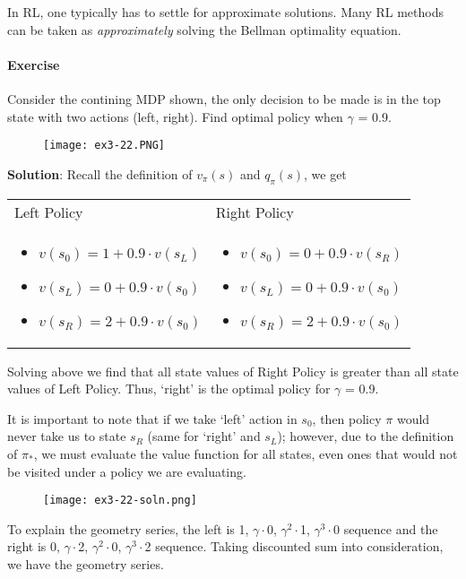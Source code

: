 \documentclass[sutton_barto_notes.tex]{subfiles}
\begin{document}
In RL, one typically has to settle for approximate solutions. Many RL methods can be taken as \textit{approximately} solving the Bellman optimality equation.

\paragraph{Exercise} Consider the contining MDP shown, the only decision to be made is in the top state with two actions (left, right).
Find optimal policy when $\gamma$ = 0.9.

\begin{figure}[!h]
  \centering
  \texttt{[image: ex3-22.PNG]}
  \label{fig:ex3-22}
\end{figure}

\textbf{Solution}: Recall the definition of $v_\pi(s)$ and $q_\pi(s)$, we get

\begin{table}[h!]
\begin{tabular}{p{}p{}}
Left Policy & Right Policy \\
\begin{itemize}
\item $ v(s_0) = 1 + 0.9\cdot v(s_L) $
\item $ v(s_L) = 0 + 0.9\cdot v(s_0) $
\item $ v(s_R) = 2 + 0.9\cdot v(s_0) $
\end{itemize} & \begin{itemize}
\item $ v(s_0) = 0 + 0.9\cdot v(s_R) $
\item $ v(s_L) = 0 + 0.9\cdot v(s_0) $
\item $ v(s_R) = 2 + 0.9\cdot v(s_0) $
\end{itemize}  
\end{tabular}
\end{table}
Solving above we find that all state values of Right Policy is greater than all state values of Left Policy. Thus, `right' is the optimal policy for $\gamma$ = 0.9.

It is important to note that if we take `left' action in $s_0$, then policy $\pi$ would never take us to state $s_R$ (same for `right' and $s_L$); however, due to the definition of $\pi_*$, we must evaluate the value function for all states, even ones that would not be visited under a policy we are evaluating.

\begin{figure}[!h]
  \centering
  \texttt{[image: ex3-22-soln.png]}
  \label{fig:ex3-22-soln}
\end{figure}
To explain the geometry series, the left is 1, $\gamma\cdot$0, $\gamma^2\cdot$1, $\gamma^3\cdot$0 sequence and the right is 0, $\gamma\cdot$2, $\gamma^2\cdot$0, $\gamma^3\cdot$2 sequence. Taking discounted sum into consideration, we have the geometry series.
\end{document}
